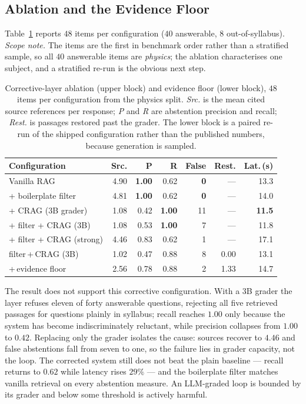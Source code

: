\documentclass[conference]{IEEEtran}
\begin{document}
\subsection{Ablation and the Evidence Floor}
\label{sec:ablation}
Table~\ref{tab:ablation} reports $48$ items per configuration ($40$ answerable,
$8$ out-of-syllabus). \textit{Scope note.} The items are the first in benchmark
order rather than a stratified sample, so all $40$ answerable items are
\emph{physics}; the ablation characterises one subject, and a stratified re-run
is the obvious next step.

\begin{table}[htbp]
\caption{Corrective-layer ablation (upper block) and evidence floor (lower
block), $48$ items per configuration from the physics split. \emph{Src.} is the
mean cited source references per response; \emph{P} and \emph{R} are abstention
precision and recall; \emph{Rest.} is passages restored past the grader. The
lower block is a paired re-run of the shipped configuration rather than the
published numbers, because generation is sampled.}
\label{tab:ablation}
\centering
\footnotesize
\setlength{\tabcolsep}{3.5pt}
\begin{tabular}{@{}lrrrrrr@{}}
\toprule
\textbf{Configuration} & \textbf{Src.} & \textbf{P} & \textbf{R} & \textbf{False} & \textbf{Rest.} & \textbf{Lat.\,(s)} \\
\midrule
Vanilla RAG              & 4.90 & \textbf{1.00} & 0.62 & \textbf{0} & --- & 13.3 \\
+ boilerplate filter     & 4.81 & \textbf{1.00} & 0.62 & \textbf{0} & --- & 14.0 \\
+ CRAG ($3$B grader)     & 1.08 & 0.42 & \textbf{1.00} & 11 & --- & \textbf{11.5} \\
+ filter + CRAG ($3$B)   & 1.08 & 0.53 & \textbf{1.00} & 7  & --- & 11.8 \\
+ filter + CRAG (strong) & 4.46 & 0.83 & 0.62 & 1  & --- & 17.1 \\
\midrule
filter\,+\,CRAG ($3$B)   & 1.02 & 0.47 & 0.88 & 8 & 0.00 & 13.1 \\
\quad +\,evidence floor  & 2.56 & 0.78 & 0.88 & 2 & 1.33 & 14.7 \\
\bottomrule
\end{tabular}
\end{table}

The result does not support this corrective configuration. With a $3$B grader
the layer refuses eleven of forty answerable questions, rejecting all five
retrieved passages for questions plainly in syllabus; recall reaches $1.00$ only
because the system has become indiscriminately reluctant, while precision
collapses from $1.00$ to $0.42$. Replacing only the grader isolates the cause:
sources recover to $4.46$ and false abstentions fall from seven to one, so the
failure lies in grader capacity, not the loop. The corrected system still does
not beat the plain baseline --- recall returns to $0.62$ while latency rises
$29\%$ --- and the boilerplate filter matches vanilla retrieval on every
abstention measure. An LLM-graded loop is bounded by its grader and below some
threshold is actively harmful.
\end{document}
